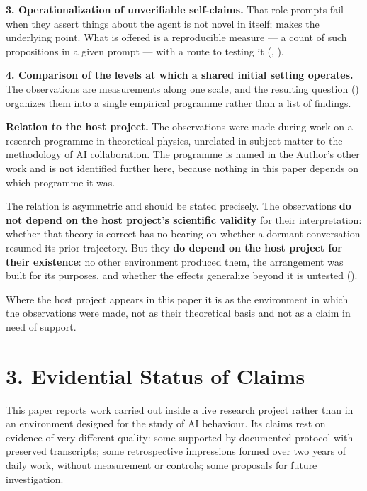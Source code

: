 \textbf{3. Operationalization of unverifiable self-claims.} That role prompts fail when they assert things about the agent is not novel in itself;  makes the underlying point. What is offered is a reproducible measure — a count of such propositions in a given prompt — with a route to testing it (, ).

\textbf{4. Comparison of the levels at which a shared initial setting operates.} The observations are measurements along one scale, and the resulting question () organizes them into a single empirical programme rather than a list of findings.

\textbf{Relation to the host project.} The observations were made during work on a research programme in theoretical physics, unrelated in subject matter to the methodology of AI collaboration. The programme is named in the Author's other work and is not identified further here, because nothing in this paper depends on which programme it was.

The relation is asymmetric and should be stated precisely. The observations \textbf{do not depend on the host project's scientific validity} for their interpretation: whether that theory is correct has no bearing on whether a dormant conversation resumed its prior trajectory. But they \textbf{do depend on the host project for their existence}: no other environment produced them, the arrangement was built for its purposes, and whether the effects generalize beyond it is untested ().

Where the host project appears in this paper it is as the environment in which the observations were made, not as their theoretical basis and not as a claim in need of support.


\section*{3. Evidential Status of Claims}
\label{sec:en:3}

This paper reports work carried out inside a live research project rather than in an environment designed for the study of AI behaviour. Its claims rest on evidence of very different quality: some supported by documented protocol with preserved transcripts; some retrospective impressions formed over two years of daily work, without measurement or controls; some proposals for future investigation.

